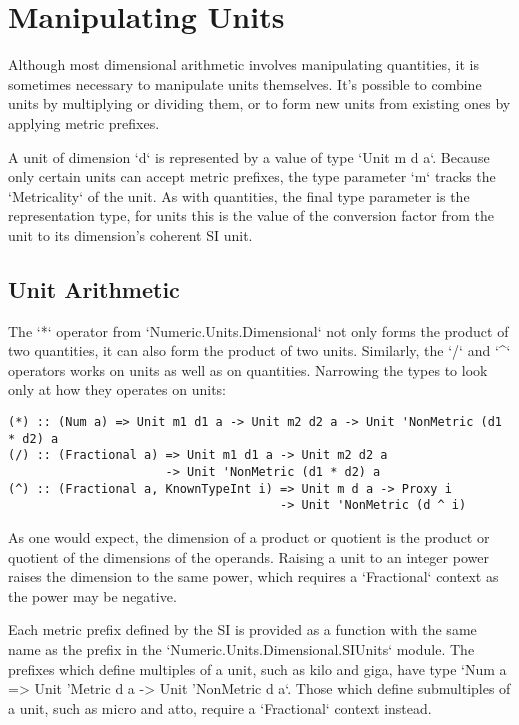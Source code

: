 \documentclass[11pt]{report}
\begin{document}
\chapter{Manipulating Units}

Although most dimensional arithmetic involves manipulating quantities, it is sometimes necessary
to manipulate units themselves. It's possible to combine units by multiplying or dividing them, or to
form new units from existing ones by applying metric prefixes.

A unit of dimension `d` is represented by a value of type `Unit m d a`. Because only certain units can
accept metric prefixes, the type parameter `m` tracks the `Metricality` of the unit. As with quantities,
the final type parameter is the representation type, for units this is the value of the conversion factor
from the unit to its dimension's coherent SI unit.

\section{Unit Arithmetic}

The `*` operator from `Numeric.Units.Dimensional` not only forms the product of two quantities, it can also
form the product of two units. Similarly, the `/` and `^` operators works on units as well as on quantities.
Narrowing the types to look only at how they operates on units:

\begin{lstlisting}
(*) :: (Num a) => Unit m1 d1 a -> Unit m2 d2 a -> Unit 'NonMetric (d1 * d2) a
(/) :: (Fractional a) => Unit m1 d1 a -> Unit m2 d2 a
                      -> Unit 'NonMetric (d1 * d2) a
(^) :: (Fractional a, KnownTypeInt i) => Unit m d a -> Proxy i
                                      -> Unit 'NonMetric (d ^ i)
\end{lstlisting}

As one would expect, the dimension of a product or quotient is the product or quotient of the dimensions of the operands.
Raising a unit to an integer power raises the dimension to the same power, which requires a `Fractional` context as the
power may be negative.

Each metric prefix defined by the SI is provided as a function with the same name as the prefix in the `Numeric.Units.Dimensional.SIUnits` module.
The prefixes which define multiples of a unit, such as kilo and giga, have type `Num a => Unit 'Metric d a -> Unit 'NonMetric d a`.
Those which define submultiples of a unit, such as micro and atto, require a `Fractional` context instead.
\end{document}

